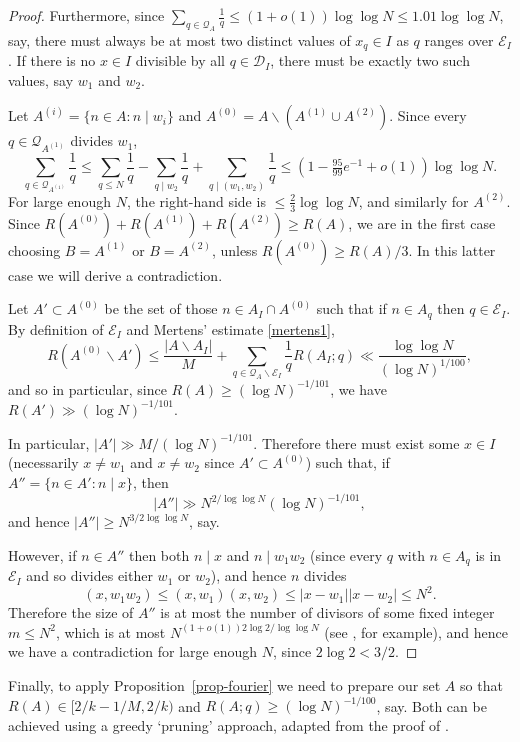 \documentclass{amsart}
\newcommand{\abs}[1]{\left\lvert #1\right\rvert}
\begin{document}
\begin{proof}
Furthermore, since $\sum_{q\in\mathcal{Q}_A}\frac{1}{q}\leq (1+o(1))\log\log N\leq 1.01\log\log N$, say, there must always be at most two distinct values of $x_q\in I$ as $q$ ranges over $\mathcal{E}_I$. If there is no $x\in I$ divisible by all $q\in\mathcal{D}_I$, there must be exactly two such values, say $w_1$ and $w_2$. 

Let $A^{(i)}=\{n\in A: n\mid w_i\}$ and $A^{(0)}=A\backslash (A^{(1)}\cup A^{(2)})$. Since every $q\in\mathcal{Q}_{A^{(1)}}$ divides $w_1$, 
\[\sum_{q\in \mathcal{Q}_{A^{(1)}}}\frac{1}{q}\leq \sum_{q\leq N}\frac{1}{q}- \sum_{q\mid w_2}\frac{1}{q}+ \sum_{q\mid (w_1,w_2)}\frac{1}{q}\leq (1-\tfrac{95}{99}e^{-1}+o(1))\log\log N.\]
For large enough $N$, the right-hand side is $\leq \frac{2}{3}\log\log N$, and similarly for $A^{(2)}$. Since $R(A^{(0)})+R(A^{(1)})+R(A^{(2)})\geq R(A)$, we are in the first case choosing $B=A^{(1)}$ or $B=A^{(2)}$, unless $R(A^{(0)})\geq R(A)/3$. In this latter case we will derive a contradiction.

Let $A'\subset A^{(0)}$ be the set of those $n\in A_I\cap A^{(0)}$ such that if $n\in A_q$ then $q\in\mathcal{E}_I$. By definition of $\mathcal{E}_I$ and Mertens' estimate \eqref{mertens1}, 
\[R(A^{(0)}\backslash A')\leq \frac{\abs{A\backslash A_I}}{M}+\sum_{q\in\mathcal{Q}_A\backslash \mathcal{E}_I}\frac{1}{q}R(A_I;q)\ll \frac{\log\log N}{(\log N)^{1/100}},\]
and so  in particular, since $R(A)\geq (\log N)^{-1/101}$, we have $R(A')\gg (\log N)^{-1/101}$.

In particular, $\abs{A'}\gg M/(\log N)^{-1/101}$. Therefore there must exist some $x\in I$ (necessarily $x\neq w_1$ and $x\neq w_2$ since $A'\subset A^{(0)}$) such that, if $A''=\{ n\in A' : n\mid x\}$, then
\[\abs{A''}\gg N^{2/\log\log N}(\log N)^{-1/101},\]
and hence $\abs{A''}\geq N^{3/2\log\log N}$, say. 

However, if $n\in A''$ then both $n\mid x$ and $n\mid w_1w_2$ (since every $q$ with $n\in A_q$ is in $\mathcal{E}_I$ and so divides either $w_1$ or $w_2$), and hence $n$ divides
\[(x,w_1w_2)\leq (x,w_1)(x,w_2)\leq \abs{x-w_1}\abs{x-w_2}\leq N^2.\]
Therefore the size of $A''$ is at most the number of divisors of some fixed integer $m\leq N^2$, which is at most $N^{(1+o(1))2\log 2/\log\log N}$ (see \cite[Theorem 2.11]{MV}, for example), and hence we have a contradiction for large enough $N$, since $2\log 2< 3/2$.
\end{proof}

Finally, to apply Proposition~\ref{prop-fourier} we need to prepare our set $A$ so that $R(A)\in [2/k-1/M,2/k)$ and $R(A;q)\geq (\log N)^{-1/100}$, say. Both can be achieved using a greedy `pruning' approach, adapted from the proof of \cite[Proposition 2]{Cr2003}.
\end{document}
